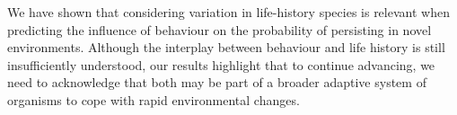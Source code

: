 We have shown that considering variation in life-history
species is relevant when predicting the influence of behaviour
on the probability of persisting in novel environments.
Although the interplay between behaviour and life history
is still insufficiently understood, our results highlight that
to continue advancing, we need to acknowledge that both
may be part of a broader adaptive system of organisms to
cope with rapid environmental changes.
